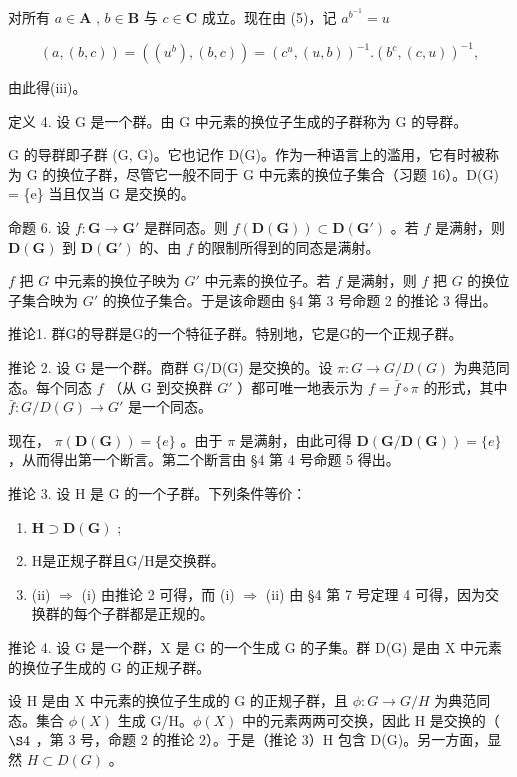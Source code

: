 对所有 \(a \in \mathbf{A}\) , \(b \in \mathbf{B}\) 与 \(c \in \mathbf{C}\) 成立。现在由 (5)，记 \(a^{b^{-1}} = u\)

\[
(a, (b, c)) = ((u ^ {b}), (b, c)) = (c ^ {u}, (u, b)) ^ {- 1}. (b ^ {c}, (c, u)) ^ {- 1},
\]

由此得(iii)。

定义 4. 设 G 是一个群。由 G 中元素的换位子生成的子群称为 G 的导群。

G 的导群即子群 (G, G)。它也记作 D(G)。作为一种语言上的滥用，它有时被称为 G 的换位子群，尽管它一般不同于 G 中元素的换位子集合（习题 16）。D(G) = \{e\} 当且仅当 G 是交换的。

命题 6. 设 \(f: \mathbf{G} \to \mathbf{G}'\) 是群同态。则 \(f(\mathbf{D}(\mathbf{G})) \subset \mathbf{D}(\mathbf{G}')\) 。若 \(f\) 是满射，则 \(\mathbf{D}(\mathbf{G})\) 到 \(\mathbf{D}(\mathbf{G}')\) 的、由 \(f\) 的限制所得到的同态是满射。

\(f\) 把 \(G\) 中元素的换位子映为 \(G'\) 中元素的换位子。若 \(f\) 是满射，则 \(f\) 把 \(G\) 的换位子集合映为 \(G'\) 的换位子集合。于是该命题由 §4 第 3 号命题 2 的推论 3 得出。

推论1. 群G的导群是G的一个特征子群。特别地，它是G的一个正规子群。

推论 2. 设 G 是一个群。商群 G/D(G) 是交换的。设 \(\pi: G \to G/D(G)\) 为典范同态。每个同态 \(f\) （从 G 到交换群 \(G'\) ）都可唯一地表示为 \(f = \bar{f} \circ \pi\) 的形式，其中 \(\bar{f}: G/D(G) \to G'\) 是一个同态。

现在， \(\pi (\mathbf{D}(\mathbf{G})) = \{e\}\) 。由于 \(\pi\) 是满射，由此可得 \(\mathbf{D}(\mathbf{G} / \mathbf{D}(\mathbf{G})) = \{e\}\) ，从而得出第一个断言。第二个断言由 §4 第 4 号命题 5 得出。

推论 3. 设 H 是 G 的一个子群。下列条件等价：

\begin{enumerate}
\def\labelenumi{(\roman{enumi})}
\item
  \(\mathbf{H} \supset \mathbf{D}(\mathbf{G})\) ;
\item
  H是正规子群且G/H是交换群。
\item
  (ii) \(\Rightarrow\) (i) 由推论 2 可得，而 (i) \(\Rightarrow\) (ii) 由 §4 第 7 号定理 4 可得，因为交换群的每个子群都是正规的。
\end{enumerate}

推论 4. 设 G 是一个群，X 是 G 的一个生成 G 的子集。群 D(G) 是由 X 中元素的换位子生成的 G 的正规子群。

设 H 是由 X 中元素的换位子生成的 G 的正规子群，且 \(\phi: G \to G/H\) 为典范同态。集合 \(\phi(X)\) 生成 G/H。\(\phi(X)\) 中的元素两两可交换，因此 H 是交换的（ \(\S 4\) ，第 3 号，命题 2 的推论 2）。于是（推论 3）H 包含 D(G)。另一方面，显然 \(H \subset D(G)\) 。

